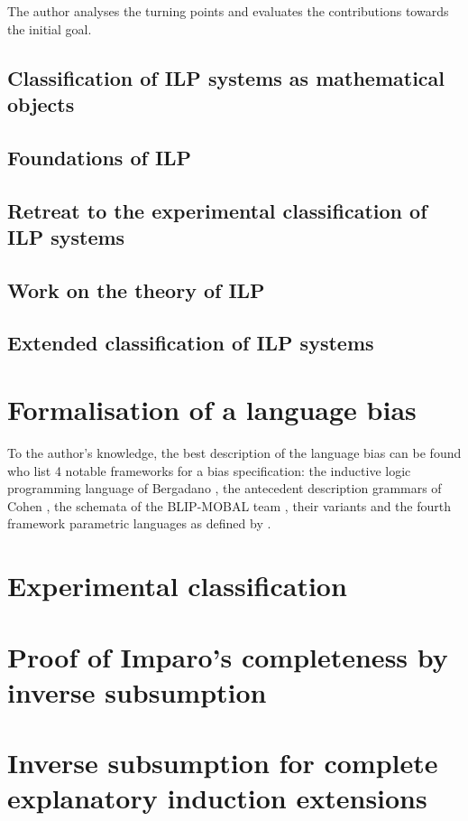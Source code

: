 The author analyses the turning points and evaluates the contributions towards the initial goal.

\subsection{Classification of ILP systems as mathematical objects}
\subsection{Foundations of ILP}
\subsection{Retreat to the experimental classification of ILP systems}
\subsection{Work on the theory of ILP}
\subsection{Extended classification of ILP systems}

\section{Formalisation of a language bias}
To the author's knowledge, the best description of the language bias can be found 
\cite{muggleton1994inductive} who list 4 notable frameworks for a bias specification: the inductive logic programming language of
Bergadano \cite{bergadano1993interactive}, the antecedent description grammars of Cohen \cite{cohen1994grammatically}\cite{cohen1992compiling}, the schemata of
the BLIP-MOBAL team \cite{emde1983discovery}\cite{kietz1992controlling}, their variants \cite{de1992interactive}\cite{silverstein1991relational}
\cite{tausend1994representing} and the fourth framework parametric languages as defined by \cite{muggleton1992efficient}\cite{de1992interactive}
\cite{buntine1987induction}\cite{cohen1993learnability}.

\section{Experimental classification}
\section{Proof of Imparo's completeness by inverse subsumption}
\section{Inverse subsumption for complete explanatory induction extensions}